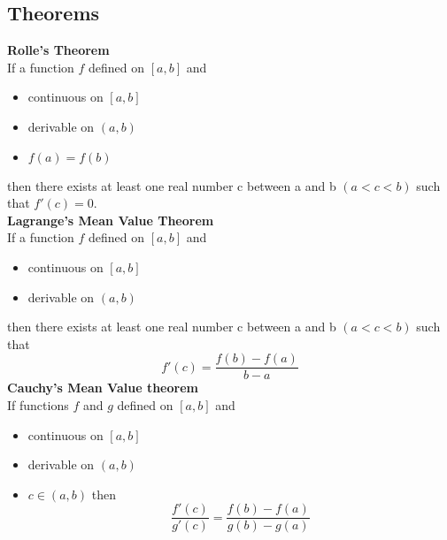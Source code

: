 \documentclass[twocolumn, 10pt]{article}
\begin{document}
\subsection{Theorems}
\textbf{Rolle's Theorem}\\
If a function $f$ defined on $[a,b]$ and
\begin{itemize} 
\item  continuous on $[a,b]$
\item derivable on $(a,b)$ 
\item $f(a)=f(b)$
\end{itemize}
then there exists at least one real number c between a and b $(a<c<b)$
such that $f'(c)=0.$ \\
\textbf{Lagrange's Mean Value Theorem } \\
If a function $f$ defined on $[a,b]$ and
\begin{itemize} 
\item  continuous on $[a,b]$
\item derivable on $(a,b)$
\end{itemize}
then there exists at least one real number c between a and b $(a<c<b)$
such that $$f'(c)=\frac{f(b)-f(a)}{b-a} $$
\textbf{Cauchy's Mean Value theorem}\\
If functions $f$  and $g$ defined on $[a,b]$ and
\begin{itemize} 
\item  continuous on $[a,b]$
\item derivable on $(a,b)$
\item $c \in (a,b)$ then
$$\frac{f'(c)}{g'(c)}=\frac{f(b)-f(a)}{g(b)-g(a)}$$
\end{itemize}
\end{document}

